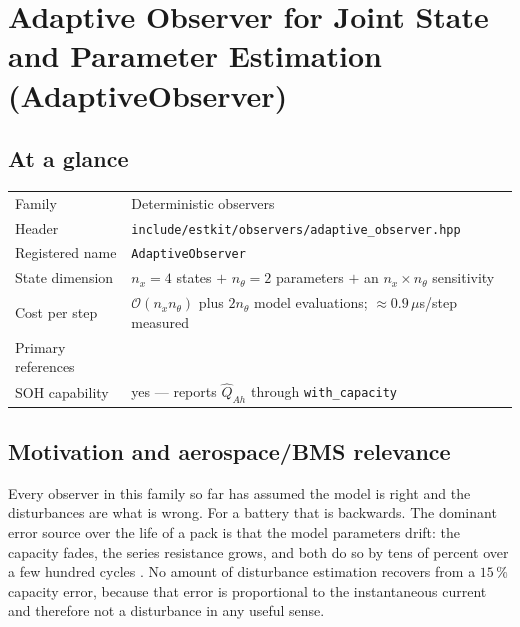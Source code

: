 \chapter{Adaptive Observer for Joint State and Parameter Estimation (AdaptiveObserver)}
\label{ch:adaptiveobserver}

\section*{At a glance}
\begin{tabular}{@{}l>{\raggedright\arraybackslash}p{}@{}}
Family & Deterministic observers \\
Header & \texttt{include/estkit/observers/adaptive\_observer.hpp} \\
Registered name & \texttt{AdaptiveObserver} \\
State dimension & $n_x = 4$ states $+$ $n_\theta = 2$ parameters $+$ an $n_x\times n_\theta$ sensitivity \\
Cost per step & $\mathcal{O}(n_x n_\theta)$ plus $2n_\theta$ model evaluations; $\approx 0.9\,\mu$s/step measured \\
Primary references & \cite{kreisselmeier1977,zhang2002adaptiveobserver,zhang2001forgetting,ioannou1996robust} \\
SOH capability & yes --- reports $\hat{Q}_{Ah}$ through \texttt{with\_capacity} \\
\end{tabular}

\section{Motivation and aerospace/BMS relevance}
Every observer in this family so far has assumed the model is right and the disturbances are what
is wrong.  For a battery that is backwards.  The dominant error source over the life of a pack is
that the model parameters drift: the capacity fades, the series resistance grows, and both do so
by tens of percent over a few hundred cycles \cite{wang2011cyclelife,schmalstieg2014aging}.  No
amount of disturbance estimation recovers from a $15\,\%$ capacity error, because that error is
proportional to the instantaneous current and therefore not a disturbance in any useful sense.

